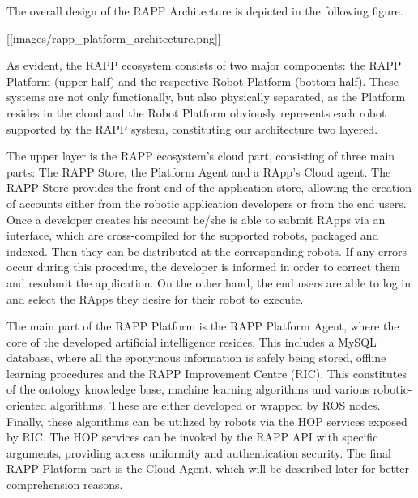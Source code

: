 The overall design of the R\-A\-P\-P Architecture is depicted in the following figure.

\mbox{[}\mbox{[}images/rapp\-\_\-platform\-\_\-architecture.\-png\mbox{]}\mbox{]}

As evident, the R\-A\-P\-P ecosystem consists of two major components\-: the R\-A\-P\-P Platform (upper half) and the respective Robot Platform (bottom half). These systems are not only functionally, but also physically separated, as the Platform resides in the cloud and the Robot Platform obviously represents each robot supported by the R\-A\-P\-P system, constituting our architecture two layered.

The upper layer is the R\-A\-P\-P ecosystem’s cloud part, consisting of three main parts\-: The R\-A\-P\-P Store, the Platform Agent and a R\-App’s Cloud agent. The R\-A\-P\-P Store provides the front-\/end of the application store, allowing the creation of accounts either from the robotic application developers or from the end users. Once a developer creates his account he/she is able to submit R\-Apps via an interface, which are cross-\/compiled for the supported robots, packaged and indexed. Then they can be distributed at the corresponding robots. If any errors occur during this procedure, the developer is informed in order to correct them and resubmit the application. On the other hand, the end users are able to log in and select the R\-Apps they desire for their robot to execute.

The main part of the R\-A\-P\-P Platform is the R\-A\-P\-P Platform Agent, where the core of the developed artificial intelligence resides. This includes a My\-S\-Q\-L database, where all the eponymous information is safely being stored, offline learning procedures and the R\-A\-P\-P Improvement Centre (R\-I\-C). This constitutes of the ontology knowledge base, machine learning algorithms and various robotic-\/oriented algorithms. These are either developed or wrapped by R\-O\-S nodes. Finally, these algorithms can be utilized by robots via the H\-O\-P services exposed by R\-I\-C. The H\-O\-P services can be invoked by the R\-A\-P\-P A\-P\-I with specific arguments, providing access uniformity and authentication security. The final R\-A\-P\-P Platform part is the Cloud Agent, which will be described later for better comprehension reasons.

